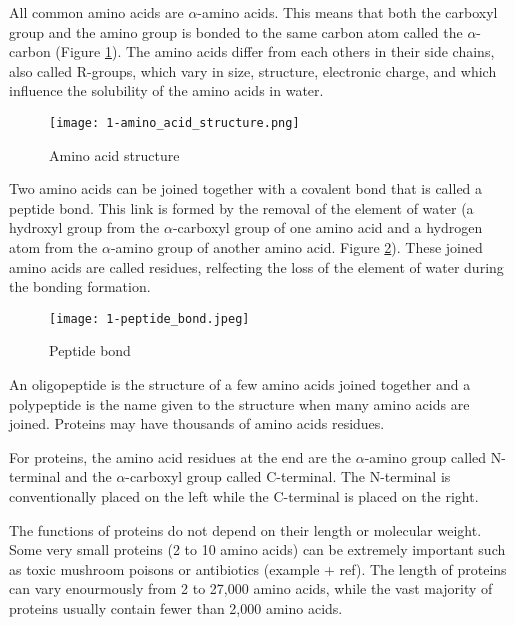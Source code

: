 All common amino acids are $\alpha$-amino acids. This means that both the carboxyl group and the amino group
is bonded to the same carbon atom called the $\alpha$-carbon (Figure \ref{fig:aastructure}). The amino acids differ from each others in
their side chains, also called R-groups, which vary in size, structure, electronic charge, and which
influence the solubility of the amino acids in water.

\begin{figure}
  \centering
  \texttt{[image: 1-amino\_acid\_structure.png]}
  \caption{Amino acid structure}
  \label{fig:aastructure}
\end{figure}

Two amino acids can be joined together with a covalent bond that is called a peptide bond. This link
is formed by the removal of the element of water (a hydroxyl group from the $\alpha$-carboxyl group
of one amino acid and a hydrogen atom from the $\alpha$-amino group of another amino acid. Figure 
\ref{fig:peptidebond}). These joined amino acids are called residues, relfecting the loss of the element
of water during the bonding formation.

\begin{figure}
  \centering
  \texttt{[image: 1-peptide\_bond.jpeg]}
  \caption{Peptide bond}
  \label{fig:peptidebond}
\end{figure}

An oligopeptide is the structure of a few amino acids joined together and a polypeptide is the name
given to the structure when many amino acids are joined. Proteins may have thousands of amino acids residues.

For proteins, the amino acid residues at the end are the $\alpha$-amino group called N-terminal and 
the $\alpha$-carboxyl group called C-terminal. The N-terminal is conventionally placed on the left while
the C-terminal is placed on the right.

The functions of proteins do not depend on their length or molecular weight. Some very small proteins 
(2 to 10 amino acids) can be extremely important such as toxic mushroom poisons or antibiotics (example + ref). The
length of proteins can vary enourmously from 2 to 27,000 amino acids, while the vast majority of proteins
usually contain fewer than 2,000 amino acids.

